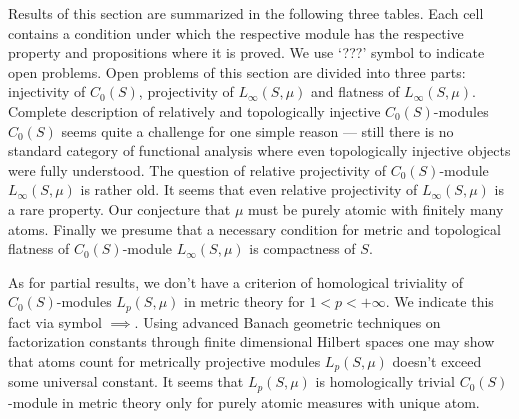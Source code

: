 Results of this section are summarized in the following three tables. Each cell
contains a condition under which the respective module has the respective
property and propositions where it is proved. We use `???' symbol to indicate 
open problems. Open problems of this section are divided into three parts:
injectivity of $C_0(S)$, projectivity of $L_\infty(S,\mu)$ and flatness of
$L_\infty(S,\mu)$. Complete description of relatively and topologically
injective $C_0(S)$-modules $C_0(S)$ seems quite a challenge for one simple
reason --- still there is no standard category of functional analysis where even
topologically injective objects were fully understood. The question of relative
projectivity of $C_0(S)$-module $L_\infty(S,\mu)$ is rather old. It seems that
even relative projectivity of $L_\infty(S,\mu)$ is a rare property. Our
conjecture that $\mu$ must be purely atomic with finitely many atoms. Finally we
presume that a necessary condition for metric and topological flatness of
$C_0(S)$-module $L_\infty(S,\mu)$ is compactness of $S$.

As for partial results, we don't have a criterion of homological triviality of
$C_0(S)$-modules $L_p(S,\mu)$ in metric theory for $1<p<+\infty$. We indicate
this fact via symbol $\implies$. Using advanced Banach geometric techniques on
factorization constants through finite dimensional Hilbert spaces one may show
that atoms count for metrically projective modules $L_p(S,\mu)$ doesn't exceed
some universal constant. It seems that $L_p(S,\mu)$ is homologically trivial
$C_0(S)$-module in metric theory only for purely atomic measures with unique
atom. 

